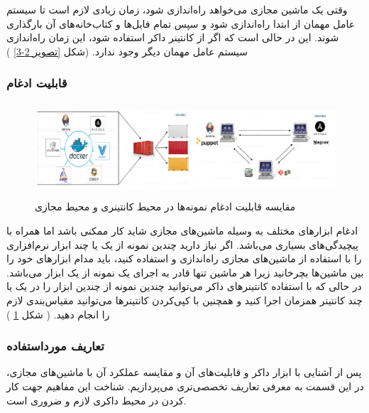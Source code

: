 وقتی یک ماشین مجازی می‌خواهد راه‌اندازی شود، زمان زیادی لازم است تا سیستم عامل مهمان از ابتدا راه‌اندازی شود و سپس تمام فایل‌ها و کتاب‌خانه‌های آن بارگذاری شوند. این در حالی است که اگر از کانتینر داکر استفاده شود، این زمان راه‌اندازی سیستم عامل مهمان دیگر وجود ندارد. (شکل
\ref{تصویر 2-3}
)

\subsubsection*{قابلیت ادغام}

\begin{figure}[!h]
	\centering
	\includegraphics[height=3.5cm]{fig2-4}
	\caption{مقایسه قابلیت ادغام نمونه‌ها در محیط کانتینری و محیط مجازی}
	\label{تصویر 2-4}
\end{figure}

ادغام ابزارهای مختلف به وسیله ماشین‌های مجازی شاید کار ممکنی باشد اما همراه با پیچیدگی‌های بسیاری می‌باشد. اگر نیاز دارید چندین نمونه از یک یا چند ابزار نرم‌افزاری را با استفاده از ماشین‌های مجازی راه‌اندازی و استفاده کنید، باید مدام ابزارهای خود را بین ماشین‌ها بچرخانید زیرا هر ماشین تنها قادر به اجرای یک نمونه از یک ابزار می‌باشد. در حالی که با استفاده کانتینرهای داکر می‌توانید چندین نمونه از چندین ابزار را در یک یا چند کانتینر همزمان اجرا کنید و همچنین با کپی‌کردن کانتینرها می‌توانید مقیاس‌بندی لازم را انجام دهید. ( شکل 
\ref{تصویر 2-4}
)


\subsubsection{تعاریف مورداستفاده}

پس از آشنایی با ابزار داکر و قابلیت‌های آن و مقایسه عملکرد آن با ماشین‌های مجازی، در این قسمت به معرفی تعاریف تخصصی‌تری می‌پردازیم. شناخت این مفاهیم جهت کار کردن در محیط داکری لازم و ضروری است.


